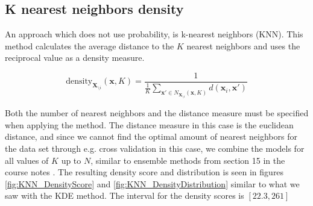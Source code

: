 \subsection{K nearest neighbors density}
An approach which does not use probability, is k-nearest neighbors (KNN). This method calculates the average distance to the $K$ nearest neighbors and uses the reciprocal value as a density measure.

\begin{equation}\label{eq:KNN}
    \text{density}_{\mathbf{X}_{\setminus i}} (\mathbf{x}, K) = \frac{1}{\frac{1}{K} \sum_{\mathbf{x'}\in N_{\mathbf{X}_{\setminus i}} (\mathbf{x}, K)} d(\mathbf{x}_i, \mathbf{x'})}
\end{equation}

Both the number of nearest neighbors and the distance measure must be specified when applying the method. The distance measure in this case is the euclidean distance, and since we cannot find the optimal amount of nearest neighbors for the data set through e.g. cross validation in this case, we combine the models for all values of $K$ up to $N$, similar to ensemble methods from section 15 in the course notes \cite{coursenotes}. The resulting density score and distribution is seen in figures \ref{fig:KNN_DensityScore} and \ref{fig:KNN_DensityDistribution} similar to what we saw with the KDE method. The interval for the density scores is $[22.3, 261]$
